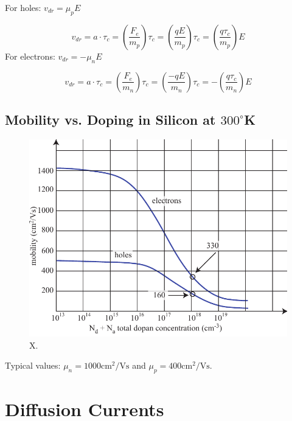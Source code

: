  For holes:   ${v_{dr}} = {\mu _p}E$

\begin{equation} 
	{v_{dr}} = a \cdot {\tau _c} = \left( {\frac{{{F_e}}}{{{m_p}}}} \right){\tau _c} = \left( {\frac{{qE}}{{{m_p}}}} \right){\tau _c} = \left( {\frac{{q{\tau _c}}}{{{m_p}}}} \right)E
\end{equation}
 For electrons:  ${v_{dr}} = -{\mu _n}E$

\begin{equation} 
	{v_{dr}} = a \cdot {\tau _c} = \left( {\frac{{{F_e}}}{{{m_n}}}} \right){\tau _c} = \left( {\frac{{-qE}}{{{m_n}}}} \right){\tau _c} = -\left( {\frac{{q{\tau _c}}}{{{m_n}}}} \right)E
\end{equation}






\subsection{Mobility vs. Doping in Silicon at $300^\circ$K}
\begin{center}

\begin{figure}
\begin{center}
\includegraphics[width=.5\columnwidth]{mobility}
\end{center}
\caption{X. } \label{fig:mobility}
\end{figure}
\end{center}


 Typical values: ${\mu _n} = 1000 \mathrm{cm^2}/\mathrm{V s}$ and ${\mu _p} = 400 \mathrm{cm^2}/\mathrm{V s}$.






\section{Diffusion Currents}












